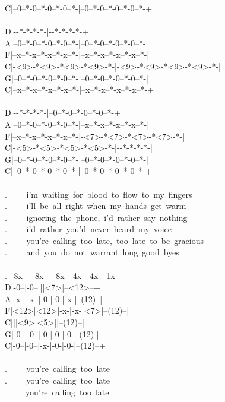 {C|--0--*-0--*-0--*-0--*-|--0--*-0--*-0--*-0--*-+\\
\\
D|-\rbrack-*\rbrack-*\rbrack-*\rbrack-*-|-\rbrack-*\rbrack-*\rbrack-*\rbrack-*-+\\
A|--0--*-0--*-0--*-0--*-|--0--*-0--*-0--*-0--*-|\\
F|--x--*-x--*-x--*-x--*-|--x--*-x--*-x--*-x--*-|\\
C|-<9>-*<9>-*<9>-*<9>-*-|-<9>-*<9>-*<9>-*<9>-*-|\\
G|--0--*-0--*-0--*-0--*-|--0--*-0--*-0--*-0--*-|\\
C|--x--*-x--*-x--*-x--*-|--x--*-x--*-x--*-x--*-+\\
\\
D|-\rbrack-*\rbrack-*\rbrack-*\rbrack-*-|--0--*-0--*-0--*-0--*-+\\
A|--0--*-0--*-0--*-0--*-|--x--*-x--*-x--*-x--*-|\\
F|--x--*-x--*-x--*-x--*-|-<7>-*<7>-*<7>-*<7>-*-|\\
C|-<5>-*<5>-*<5>-*<5>-*-|-\rbrack-*\rbrack-*\rbrack-*\rbrack-*-|\\
G|--0--*-0--*-0--*-0--*-|--0--*-0--*-0--*-0--*-|\\
C|--0--*-0--*-0--*-0--*-|--0--*-0--*-0--*-0--*-+\\
\\
. \ \ \ \ i'm\ waiting\ for\ blood\ to\ flow\ to\ my\ fingers\\
. \ \ \ \ i'll\ be\ all\ right\ when\ my\ hands\ get\ warm\\
. \ \ \ \ ignoring\ the\ phone,\ i'd\ rather\ say\ nothing\\
. \ \ \ \ i'd\ rather\ you'd\ never\ heard\ my\ voice\\
. \ \ \ \ you're\ calling\ too\ late,\ too\ late\ to\ be\ gracious\\
. \ \ \ \ and\ you\ do\ not\ warrant\ long\ good\ byes\\\
\\
. \ 8x\ \ \ 8x\ \ \ 8x\ \ 4x\ \ 4x\ \ 1x\\
D|-0--|-0--|\rbrack|\rbrack|<7>|--<12>--+\\
A|-x--|-x--|-0-|-0-|-x-|--(12)--|\\
F|<12>|<12>|-x-|-x-|<7>|--(12)--|\\
C|\rbrack|\rbrack|<9>|<5>|\rbrack|--(12)--|\\
G|-0--|-0--|-0-|-0-|-0-|-\lbrack (12)\rbrack-|\\
C|-0--|-0--|-x-|-0-|-0-|--(12)--+\\
\\
. \ \ \ \ you're\ calling\ too\ late\\
. \ \ \ \ you're\ calling\ too\ late\\
\ \ \ \ \ you're\ calling\ too\ late 
\iffalse
\fi
}

